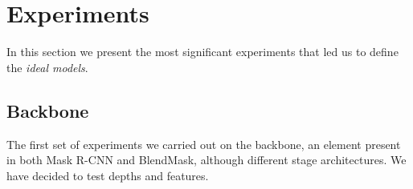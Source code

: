 \documentclass[10pt,twocolumn,letterpaper]{article}
\begin{document}
\section{Experiments}
\label{sec:experiments}
In this section we present the most significant experiments that led us to define the \textit{ideal models}.


\subsection{Backbone}
\label{experiments:second_trial}
The first set of experiments we carried out on the backbone, an element present in both Mask R-CNN and BlendMask, although different stage architectures.
We have decided to test depths and features.
\end{document}
